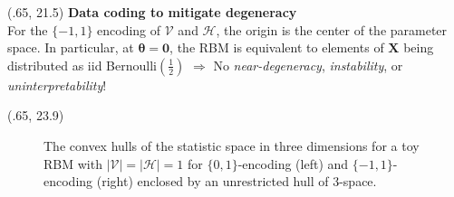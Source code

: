 \documentclass[extrafontsizes, 30pt]{memoir}
\begin{document}
\begin{textblock}{14}(.65, 21.5)
{\large \bfseries Data coding to mitigate degeneracy} \\[-.75cm]

For the $\{-1, 1 \}$ encoding of $\mathcal{V}$ and $\mathcal{H}$, the origin is the center of the parameter space. In particular, at $\boldsymbol \theta = \boldsymbol 0$, the RBM is equivalent to elements of $\boldsymbol X$ being distributed as iid Bernoulli$\left(\frac{1}{2}\right)$ $\Rightarrow$ No \emph{near-degeneracy}, \emph{instability}, or \emph{uninterpretability}!
\end{textblock}
\begin{textblock}{14.5}(.65, 23.9)
\begin{figure}[ht]
  \begin{minipage}{0.49\textwidth}
  \end{minipage}
  \begin{minipage}{0.49\textwidth}
  \end{minipage}
  \caption{The convex hulls of the statistic space in three dimensions for a toy RBM with $|\mathcal{V}| = |\mathcal{H}| = 1$ for $\{0,1\}$-encoding (left) and $\{-1,1\}$-encoding (right) enclosed by an unrestricted hull of 3-space.}
 \label{fig:toyhull}
\end{figure}

\end{textblock}
\end{document}
